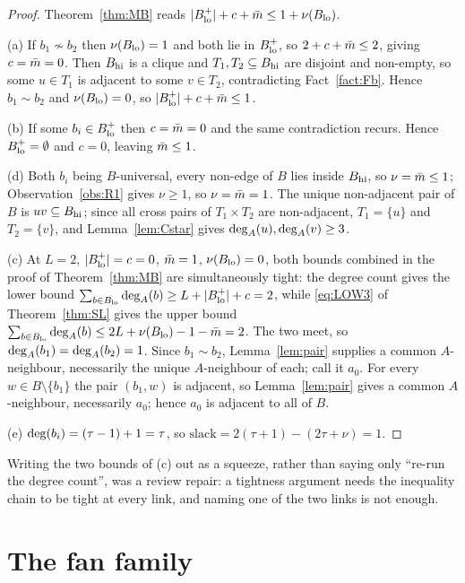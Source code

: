 \begin{proof}
Theorem~\ref{thm:MB} reads $|B_{\mathrm{lo}}^{+}| + c + \bar{m} \le 1 + \nu(B_{\mathrm{lo}})$.

(a) If $b_1 \not\sim b_2$ then $\nu(B_{\mathrm{lo}}) = 1$ and both lie in $B_{\mathrm{lo}}^{+}$, so
$2 + c + \bar{m} \le 2$, giving $c = \bar{m} = 0$. Then $B_{\mathrm{hi}}$ is a clique and
$T_1, T_2 \subseteq B_{\mathrm{hi}}$ are disjoint and non-empty, so some $u \in T_1$ is adjacent to
some $v \in T_2$, contradicting Fact~\ref{fact:Fb}. Hence $b_1 \sim b_2$ and
$\nu(B_{\mathrm{lo}}) = 0$, so $|B_{\mathrm{lo}}^{+}| + c + \bar{m} \le 1$.

(b) If some $b_i \in B_{\mathrm{lo}}^{+}$ then $c = \bar{m} = 0$ and the same contradiction recurs.
Hence $B_{\mathrm{lo}}^{+} = \emptyset$ and $c = 0$, leaving $\bar{m} \le 1$.

(d) Both $b_i$ being $B$-universal, every non-edge of $B$ lies inside $B_{\mathrm{hi}}$, so
$\nu = \bar{m} \le 1$; Observation~\ref{obs:R1} gives $\nu \ge 1$, so $\nu = \bar{m} = 1$. The
unique non-adjacent pair of $B$ is $uv \subseteq B_{\mathrm{hi}}$; since all cross pairs of
$T_1 \times T_2$ are non-adjacent, $T_1 = \{u\}$ and $T_2 = \{v\}$, and
Lemma~\ref{lem:Cstar} gives $\mathrm{deg}_A(u),\mathrm{deg}_A(v) \ge 3$.

(c) At $L = 2$, $|B_{\mathrm{lo}}^{+}| = c = 0$, $\bar{m} = 1$, $\nu(B_{\mathrm{lo}}) = 0$, both bounds combined in
the proof of Theorem~\ref{thm:MB} are simultaneously tight: the degree count gives the lower
bound $\sum_{b\in B_{\mathrm{lo}}}\mathrm{deg}_A(b) \ge L + |B_{\mathrm{lo}}^{+}| + c = 2$, while \eqref{eq:LOW3} of
Theorem~\ref{thm:SL} gives the upper bound
$\sum_{b\in B_{\mathrm{lo}}}\mathrm{deg}_A(b) \le 2L + \nu(B_{\mathrm{lo}}) - 1 - \bar{m} = 2$. The two meet, so
$\mathrm{deg}_A(b_1) = \mathrm{deg}_A(b_2) = 1$. Since $b_1 \sim b_2$, Lemma~\ref{lem:pair} supplies a common
$A$-neighbour, necessarily the unique $A$-neighbour of each; call it $a_0$. For every
$w \in B \setminus \{b_1\}$ the pair $(b_1,w)$ is adjacent, so Lemma~\ref{lem:pair} gives a
common $A$-neighbour, necessarily $a_0$; hence $a_0$ is adjacent to all of $B$.

(e) $\mathrm{deg}(b_i) = (\tau-1)+1 = \tau$, so
$\mathrm{slack} = 2(\tau+1) - (2\tau + \nu) = 1$.
\end{proof}

Writing the two bounds of (c) out as a squeeze, rather than saying only ``re-run the degree
count'', was a review repair: a tightness argument needs the inequality chain to be tight at
every link, and naming one of the two links is not enough.

\section{The fan family}\label{sec:fan}

